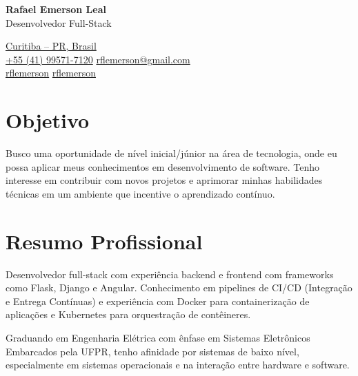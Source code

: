 \documentclass[a4paper,10pt]{article}
\begin{document}

\noindent
\begin{minipage}[t]{0.5\textwidth}
    \textbf{\LARGE Rafael Emerson Leal} \\[0.6em]
    {\large \color{darkgray} Desenvolvedor Full-Stack}
    \vspace{0.4em}
\end{minipage}%
\begin{minipage}[t]{0.5\textwidth}
\raggedleft
\href{https://maps.app.goo.gl/fPieLVkxevk84gFT7}{\faMapMarker \space Curitiba -- PR, Brasil}\\
\href{tel:+5541995717120}{\faPhone \space +55 (41) 99571-7120}
\quad
\href{mailto:rflemerson@gmail.com}{\faEnvelope \space rflemerson@gmail.com}\\
\vspace{0.2em}
\href{https://github.com/rflemerson}{\faGithub \space rflemerson} \quad
\href{https://www.linkedin.com/in/rflemerson/}{\faLinkedin \space rflemerson}
\end{minipage}

\vspace{1em}

\section*{Objetivo}\vspace{0.6em}

Busco uma oportunidade de nível inicial/júnior na área de tecnologia, onde eu possa aplicar meus conhecimentos em desenvolvimento de software. Tenho interesse em contribuir com novos projetos e aprimorar minhas habilidades técnicas em um ambiente que incentive o aprendizado contínuo.

\section*{Resumo Profissional}\vspace{0.6em}

Desenvolvedor full-stack com experiência backend e frontend com frameworks como Flask, Django e Angular. Conhecimento em pipelines de CI/CD (Integração e Entrega Contínuas) e experiência com Docker para containerização de aplicações e Kubernetes para orquestração de contêineres. 

\vspace{0.6em}\noindent
Graduando em Engenharia Elétrica com ênfase em Sistemas Eletrônicos Embarcados pela UFPR, tenho afinidade por sistemas de baixo nível, especialmente em sistemas operacionais e na interação entre hardware e software.
\end{document}
